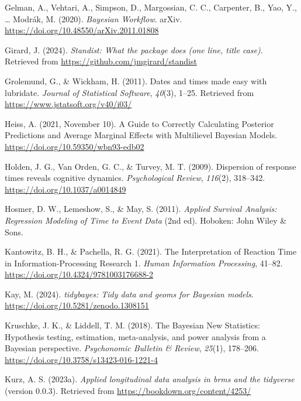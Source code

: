\documentclass[
  man, donotrepeattitle,floatsintext]{apa6}
\newlength{\cslhangindent}
\newenvironment{CSLReferences}[2] %
 {\begin{list}{}{%
  \setlength{\itemindent}{0pt}
  \setlength{\leftmargin}{0pt}
  \setlength{\parsep}{0pt}
  \ifodd #1
   \setlength{\leftmargin}{\cslhangindent}
   \setlength{\itemindent}{-1\cslhangindent}
  \fi
  \setlength{\itemsep}{#2\baselineskip}}}
 {\end{list}}
\begin{document}
\begin{CSLReferences}{1}{0}
Gelman, A., Vehtari, A., Simpson, D., Margossian, C. C., Carpenter, B., Yao, Y., \ldots{} Modrák, M. (2020). \emph{Bayesian {Workflow}}. arXiv. \url{https://doi.org/10.48550/arXiv.2011.01808}

Girard, J. (2024). \emph{Standist: What the package does (one line, title case)}. Retrieved from \url{https://github.com/jmgirard/standist}

Grolemund, G., \& Wickham, H. (2011). Dates and times made easy with {lubridate}. \emph{Journal of Statistical Software}, \emph{40}(3), 1--25. Retrieved from \url{https://www.jstatsoft.org/v40/i03/}

Heiss, A. (2021, November 10). A Guide to Correctly Calculating Posterior Predictions and Average Marginal Effects with Multilievel {Bayesian} Models. \url{https://doi.org/10.59350/wbn93-edb02}

Holden, J. G., Van Orden, G. C., \& Turvey, M. T. (2009). Dispersion of response times reveals cognitive dynamics. \emph{Psychological Review}, \emph{116}(2), 318--342. \url{https://doi.org/10.1037/a0014849}

Hosmer, D. W., Lemeshow, S., \& May, S. (2011). \emph{Applied {Survival Analysis}: {Regression Modeling} of {Time} to {Event Data}} (2nd ed). Hoboken: John Wiley \& Sons.

Kantowitz, B. H., \& Pachella, R. G. (2021). The {Interpretation} of {Reaction Time} in {Information-Processing Research} 1. \emph{Human Information Processing}, 41--82. \url{https://doi.org/10.4324/9781003176688-2}

Kay, M. (2024). \emph{{tidybayes}: Tidy data and geoms for {Bayesian} models}. \url{https://doi.org/10.5281/zenodo.1308151}

Kruschke, J. K., \& Liddell, T. M. (2018). The {Bayesian New Statistics}: {Hypothesis} testing, estimation, meta-analysis, and power analysis from a {Bayesian} perspective. \emph{Psychonomic Bulletin \& Review}, \emph{25}(1), 178--206. \url{https://doi.org/10.3758/s13423-016-1221-4}

Kurz, A. S. (2023a). \emph{Applied longitudinal data analysis in brms and the tidyverse} (version 0.0.3). Retrieved from \url{https://bookdown.org/content/4253/}


\end{CSLReferences}
\end{document}
